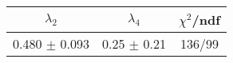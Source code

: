 \begin{tabular}{c|c||c}
$\lambda_{2}$ & $\lambda_4$ & $\chi^{2}$/ndf \\
\hline
0.480 $\pm$ 0.093 & 0.25 $\pm$ 0.21 & 136/99\\
\end{tabular}
